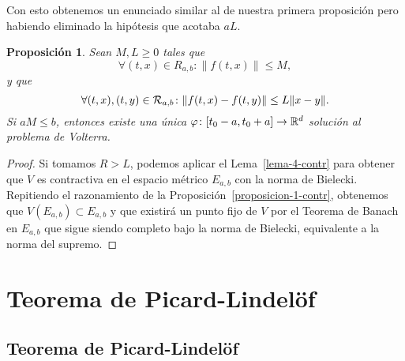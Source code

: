 \documentclass[11pt]{article}
\theoremstyle{plain}
\newtheorem{proposition}{Proposición}
\theoremstyle{definition}
\theoremstyle{remark}
\begin{document}
Con esto obtenemos un enunciado similar al de nuestra primera proposición
pero habiendo eliminado la hipótesis que acotaba $aL$.

\begin{proposition}\label{proposicion-2-contr}
Sean $M,L \geq 0$ tales que
\[
\forall (t,x) \in R_{a,b}\colon \|f(t,x)\| \leq M,
\]
y que
\[
\forall (t,x),(t,y) \in {{\cal{R}}}_{a,b}\colon \|f(t,x)-f(t,y)\| \leq L\|x-y\|.
\]
Si $aM\leq b$, entonces existe una única $\varphi\colon [t_0-a,t_0+a] \to \mathbb{R}^d$
solución al problema de Volterra.
\end{proposition}
\begin{proof}
  Si tomamos $R > L$, podemos aplicar el Lema~\ref{lema-4-contr} para
  obtener que $V$ es contractiva en el espacio métrico $E_{a,b}$ con la
  norma de Bielecki. Repitiendo el razonamiento de la Proposición~\ref{proposicion-1-contr},
  obtenemos que $V(E_{a,b}) \subset E_{a,b}$ y que existirá un punto
  fijo de $V$ por el Teorema de Banach en $E_{a,b}$ que sigue siendo
  completo bajo la norma de Bielecki, equivalente a la norma del supremo.
\end{proof}

\section{Teorema de Picard-Lindelöf}

\subsection{Teorema de Picard-Lindelöf}
\end{document}
